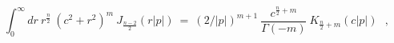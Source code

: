 \begin{equation}
\int _{0}^{\infty} dr~r^{\frac {n}{2}} ~(c^2 + r^2)^{m}
~J_{\frac{n-2}{2}}(r|p|) ~=~ (2/|p|)^{m+1}~\frac { c^{\frac{n}{2} +m} }
{\Gamma(-m)}~K_{\frac{n}{2} +m}(c|p|) ~~~,
\end{equation}

